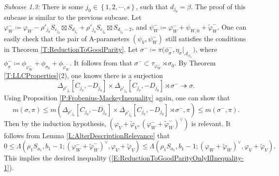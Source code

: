 \documentclass[11pt,letterpaper]{amsart}
\theoremstyle{plain}
\numberwithin{theorem}{section}
\numberwithin{equation}{subsection}
\theoremstyle{remark}
\def\calA{\mathcal{A}}
\begin{document}
\vskip 5pt

\emph{Subcase 1.3:} There is some $j_0\in\left\{1,2,\cdots,s\right\}$, such that $d_{j_0}=\beta$. The proof of this subcase is similar to the previous subcase. Let $\varphi_W^-\coloneqq \varphi_W - \rho'_{j_0} S_{c_{j_0}}\boxtimes S_{d_{j_0}} + \rho'_{j_0} S_{c_{j_0}}\boxtimes S_{d_{j_0}-2}$, and $\psi_W^- \coloneqq \varphi_W^- + \psi_{W,0} + \widetilde{\varphi}_W^-$. One can easily check that the pair of A-parameters $\left(\psi_V,\psi_W^-\right)$ still satisfies the conditions in Theorem \ref{T:ReductionToGoodParity}. Let $\sigma^-\coloneqq\pi\Big(\phi_\sigma^-,\eta_\sigma\big|_{\calA_{\phi_\sigma^-}}\Big)$, where $\phi_\sigma^-\coloneqq \phi_{\varphi_W^-} + \phi_{\sigma_0} + \phi_{\widetilde{\varphi}_W^-}$. It follows from \cite[Prop. 5.3]{MR2504024} that $\sigma^-\subset\tau_{\varphi_W^-}\rtimes\sigma_0$. By Theorem \ref{T:LLCProperties}(2), one knows there is a surjection
\[
    \Delta_{\rho'_{j_0}}\left[C_{j_0},-D_{j_0}\right] \times \Delta_{\widetilde{\rho}'_{j_0}}\left[C_{j_0},-D_{j_0}\right] \rtimes \sigma^-\twoheadrightarrow \sigma.
\]
Using Proposition \ref{P:Frobenius-MackeyInequality} again, one can show that
\[
    m\left(\sigma,\pi\right)\leq m\left(\Delta_{\rho'_{j_0}}\left[C_{j_0},-D_{j_0}\right] \times \Delta_{\widetilde{\rho}'_{j_0}}\left[C_{j_0},-D_{j_0}\right] \rtimes \sigma^-,\pi\right) \leq m\left(\sigma^-,\pi\right).
\]
Then by the induction hypothesis, $\left(\varphi_V+\widetilde{\varphi}_V, \left(\varphi_W^-+\widetilde{\varphi}^-_W\right)^\vee\right)$ is relevant. It follows from Lemma \ref{L:AlterDescriptionRelevance} that
\[
    0\leq \Lambda\left(\rho_1 S_{a_1}, b_1-1;\left(\varphi_W^-+\widetilde{\varphi}_W^-\right)^\vee,\varphi_V+\widetilde{\varphi}_V\right) \leq \Lambda\left(\rho_1 S_{a_1}, b_1-1;\left(\varphi_W+\widetilde{\varphi}_W\right)^\vee,\varphi_V+\widetilde{\varphi}_V\right).
\]
This implies the desired inequality (\ref{E:ReductionToGoodParityOnlyIfInequality-1}).

\vskip 5pt
\end{document}
